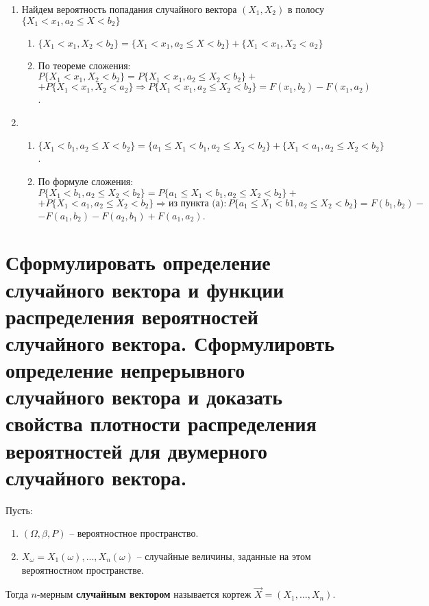 \begin{enumerate}[label=(\alph*)]
	\item Найдем вероятность попадания случайного вектора $(X_1, X_2)$ в полосу $\{X_1 < x_1, a_2 \leq X < b_2\}$
	
	\begin{enumerate}[label=\arabic*.]
		\item $\{X_1 < x_1, X_2 < b_2\} = \{X_1 < x_1, a_2 \leq X < b_2\} + \{X_1 < x_1, X_2 < a_2\}$
		
		\item По теореме сложения: $P\{X_1 < x_1, X_2 < b_2\} = P\{X_1 < x_1, a_2 \leq X_2 < b_2 \} +$\newline$+P\{X_1 < x_1, X_2 < a_2\} \Rightarrow P\{X_1<x_1,a_2\leq X_2<b_2\} = F(x_1, b_2) - F(x_1, a_2)$.
	\end{enumerate}
	
	\item \begin{enumerate}[label=\arabic*.]
		\item $\{X_1 < b_1, a_2 
		\leq X <b_2\} = \{a_1 \leq X_1 < b_1, a_2 \leq X_2 < b_2\} + \{X_1 < a_1, a_2 \leq X_2 < b_2\}$.
		
		\item По формуле сложения: $P\{X_1 < b_1, a_2 \leq X_2 < b_2\} = P\{a_1 \leq X_1 < b_1, a_2 \leq X_2 < b_2\} +$ 
		\newline$+P\{X_1 < a_1, a_2 \leq X_2 < b_2\} \Rightarrow \text{из пункта (а)}: P\{a_1 \leq X_1 < b1, a_2 \leq X_2 < b_2\} =  F(b_1, b_2) -$ $-F(a_1, b_2)-F(a_2, b_1) + F(a_1, a_2)$.
	\end{enumerate}
	
\end{enumerate}



\section{Сформулировать определение случайного вектора и функции распределения вероятностей случайного вектора. Сформулировть определение непрерывного случайного вектора и доказать свойства плотности распределения вероятностей для двумерного случайного вектора.}

Пусть: 
\begin{enumerate}
	\item $(\Omega, \beta, P)$ -- вероятностное пространство.
	
	\item $X_{\omega} = X_1(\omega),...,X_n(\omega)$ -- случайные величины, заданные на этом вероятностном пространстве.
\end{enumerate}
Тогда $n$-мерным \textbf{случайным вектором} называется кортеж $\vec{X} = (X_1,..., X_n)$.

